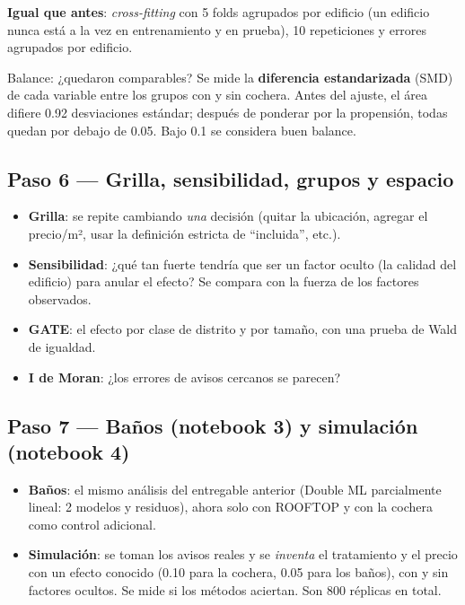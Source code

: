 \documentclass[11pt,a4paper]{article}
\begin{document}
\textbf{Igual que antes}: \textit{cross-fitting} con 5 folds agrupados por edificio (un edificio nunca está a la vez en entrenamiento y en prueba), 10 repeticiones y errores agrupados por edificio.

\begin{idea}{Balance: ¿quedaron comparables?}
Se mide la \textbf{diferencia estandarizada} (SMD) de cada variable entre los grupos con y sin cochera. Antes del ajuste, el área difiere 0.92 desviaciones estándar; después de ponderar por la propensión, todas quedan por debajo de 0.05. Bajo 0.1 se considera buen balance.
\end{idea}

\subsection{Paso 6 --- Grilla, sensibilidad, grupos y espacio}

\begin{itemize}
\item \textbf{Grilla}: se repite cambiando \emph{una} decisión (quitar la ubicación, agregar el precio/m², usar la definición estricta de ``incluida'', etc.).
\item \textbf{Sensibilidad}: ¿qué tan fuerte tendría que ser un factor oculto (la calidad del edificio) para anular el efecto? Se compara con la fuerza de los factores observados.
\item \textbf{GATE}: el efecto por clase de distrito y por tamaño, con una prueba de Wald de igualdad.
\item \textbf{I de Moran}: ¿los errores de avisos cercanos se parecen?
\end{itemize}

\subsection{Paso 7 --- Baños (notebook 3) y simulación (notebook 4)}

\begin{itemize}
\item \textbf{Baños}: el mismo análisis del entregable anterior (Double ML parcialmente lineal: 2 modelos y residuos), ahora solo con ROOFTOP y con la cochera como control adicional.
\item \textbf{Simulación}: se toman los avisos reales y se \emph{inventa} el tratamiento y el precio con un efecto conocido (0.10 para la cochera, 0.05 para los baños), con y sin factores ocultos. Se mide si los métodos aciertan. Son 800 réplicas en total.
\end{itemize}
\end{document}
